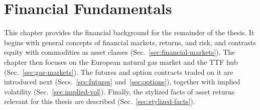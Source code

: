 \section{Financial Fundamentals}\label{sec:financial-fundamentals}
This chapter provides the financial background for the remainder of the thesis. It begins with general concepts of financial markets, returns, and risk, and contrasts equity with commodities as asset classes (Sec.~\ref{sec:financial-markets}). The chapter then focuses on the European natural gas market and the TTF hub (Sec.~\ref{sec:gas-markets}). The futures and option contracts traded on it are introduced next (Secs.~\ref{sec:futures}
and~\ref{sec:options}), together with implied volatility (Sec.~\ref{sec:implied-vol}). Finally, the stylized facts of asset returns relevant for this thesis are described (Sec.~\ref{sec:stylized-facts}).





